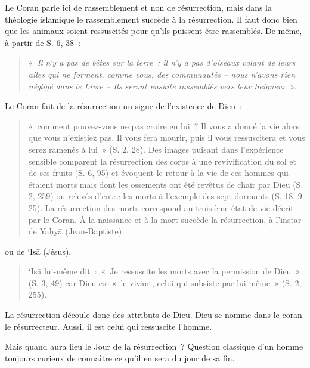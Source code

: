 Le Coran parle ici de rassemblement et non de résurrection, mais dans la
théologie islamique le rassemblement succède à la résurrection. Il faut
donc bien que les animaux soient ressuscités pour qu'ils puissent être
rassemblés. De même, à partir de S. 6, 38~: 
\begin{quote}
    

«~\emph{Il n'y a pas de
bêtes sur la terre~; il n'y a pas d'oiseaux volant de leurs ailes qui ne
forment, comme vous, des communautés -- nous n'avons rien négligé dans
le Livre -- Ils seront ensuite rassemblés vers leur Seigneur}~».
\end{quote}
Le Coran fait de la résurrection un signe de l'existence de Dieu~:
\begin{quote}
    

«~comment pouvez-vous ne pas croire en lui~? Il vous a donné la vie
alors que vous n'existiez pas. Il vous fera mourir, puis il vous
ressuscitera et vous serez ramenés à lui~» (S. 2, 28). Des images
puisant dans l'expérience sensible comparent la résurrection des corps à
une revivification du sol et de ses fruits (S. 6, 95) et évoquent le
retour à la vie de ces hommes qui étaient morts mais dont les ossements
ont été revêtus de chair par Dieu (S. 2, 259) ou relevés d'entre les
morts à l'exemple des sept dormants (S. 18, 9-25). La résurrection des
morts correspond au troisième état de vie décrit par le Coran. À la
naissance et à la mort succède la résurrection, à l'instar de Yaḥyā
(Jean-Baptiste)
\end{quote}
 ou de `Isā (Jésus). 
  
  \begin{quote}
      `Isā lui-même dit~:~«~Je
ressuscite les morts avec la permission de Dieu~» (S. 3, 49) car Dieu
est «~le vivant, celui qui subsiste par lui-même~» (S. 2, 255).
  \end{quote} 
  La
résurrection découle donc des attributs de Dieu. Dieu se nomme dans le
coran le résurrecteur. Aussi, il est celui qui ressuscite l'homme.

Mais quand aura lieu le Jour de la résurrection~? Question classique
d'un homme toujours curieux de connaître ce qu'il en sera du jour de sa
fin.


